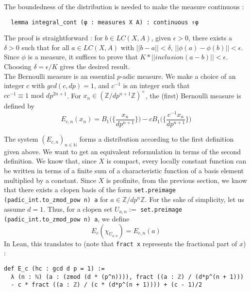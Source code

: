 \documentclass[a4paper,UKenglish,cleveref, autoref, thm-restate]{lipics-v2021}
\newcommand{\lean}[1]{\texttt{#1}\xspace} %
\begin{document}
The boundedness of the distribution is needed to make the measure continuous :
\begin{lstlisting}
  lemma integral_cont (φ : measures X A) : continuous ⇑φ
\end{lstlisting}

The proof is straightforward : for $b \in LC(X, A)$, given $\epsilon > 0$, there exists a
$\delta > 0$ such that for all $a \in LC(X, A)$ with $|| b - a || < \delta$,
$|| \phi(a) - \phi(b) || < \epsilon$. Since $\phi$ is a measure, it suffices to prove that
$ K * ||inclusion (a - b)|| < \epsilon $. Choosing $\delta  = \epsilon / K$ gives the desired
result. \\

The Bernoulli measure is an essential $p$-adic measure. We make a choice of an integer $c$ with
$gcd(c,dp) = 1$, and $c^{-1}$ is an integer such that $c c^{-1} \equiv 1 \text{ mod } dp^{2n+1}$.
For $x_n \in (\mathbb{Z} / dp^{n +1} \mathbb{Z})^{\times}$, the (first) Bernoulli measure is defined by
$$ E_{c,n}(x_n) = B_1 \bigg( \bigg\{ \frac{x_n}{dp^{n + 1}} \bigg\} \bigg) -
  cB_1 \bigg( \bigg\{ \frac{c^{-1}x_n}{dp^{n + 1}} \bigg\} \bigg) $$

The system $(E_{c,n})_{n \in \mathbb{N}}$ forms a distribution according to the first definition
given above. We want to get an equivalent reformulation in terms of the second definition.
We know that, since $X$ is compact, every locally constant function can be written in terms of a
finite sum of a characteristic function of a basis element multiplied by a constant. Since $X$ is
profinite, from the previous section, we know that there exists a clopen basis of the form
\lean{set.preimage (padic\_int.to\_zmod\_pow n) {a}} for $a \in\mathbb{Z}/dp^{n} \mathbb{Z}$. 
For the sake of simplicity, let us assume $d = 1$. Thus, for a
clopen set $U_{a,n} := $ \lean{set.preimage (padic\_int.to\_zmod\_pow n) {a}}, we define
$$ E_c (\chi_{U_{a,n}}) = E_{c,n} (a) $$
In Lean, this translates to (note that \lean{fract x} represents the fractional part of $x$) :
\begin{lstlisting}
def E_c (hc : gcd d p = 1) := 
  λ (n : ℕ) (a : (zmod (d * (p^n)))), fract ((a : ℤ) / (d*p^(n + 1))) 
  - c * fract ((a : ℤ) / (c * (d*p^(n + 1)))) + (c - 1)/2
\end{lstlisting}

\end{document}
